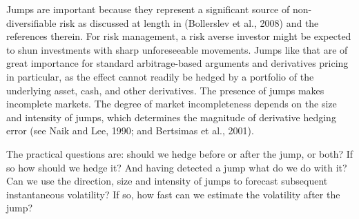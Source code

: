 Jumps are important because they represent a significant source of non-diversifiable risk as discussed at length in (Bollerslev et al., 2008)
and the references therein. For risk management, a risk averse investor might be expected to shun investments with sharp unforeseeable movements.
Jumps like that are of great importance for standard arbitrage-based arguments and derivatives pricing in particular, as the effect cannot readily 
be hedged by a portfolio of the underlying asset, cash, and other derivatives. The presence of jumps makes incomplete markets. The degree of market
incompleteness depends on the size and intensity of jumps, which determines the magnitude of derivative hedging error (see Naik and Lee, 1990; and
Bertsimas et al., 2001). 


The practical questions are: should we hedge before or after the jump, or both? If so how should we hedge it? And having detected a jump what do we do with it? Can we use the direction, size and intensity of jumps to forecast subsequent instantaneous volatility? If so, how fast can we estimate the
volatility after the jump? 



\nocite{ait2010high,
ait2011ultra,               
bannouh2009range,            barndorff2002econometric,   
barndorff2004econometric,   barndorff2009realized,   
barndorff2011multivariate,   bollerslev2008risk,         
christensen2012covariation,  corsi2010threshold,         
delbaen1994general,          dionne2009intraday,         
dovonon2012bootstrapping,    dumas2002implied,           
epps1979comovements,         evans2005currency,          
fan2012vast,                 foster1996continuous,       
griffin2011covariance,       hayashi2005covariance,      
hayashi2006nonsynchronously, hayashi2008asymptotic,      
hull2009options,             mastromatteo2011financial,  
munnix2010compensating,      munnix2010impact,           
mykland2008infrence,         mykland2012econometrics,    
precup2007cross,             puntanen2005historical,     
reno2003closer,              todorov2011volatility,      
toth2007modeling,            toth2009accurate,           
toth2009epps,                voev2007integrated,         
wang2010vast,                zhang2005tale,              
zhang2011estimating,         zhou1998estimating,         
cont2003financial,           dacorogna2001introduction,  
fitzgerald1993financial,     revuz2004continuous,        
schoutens2003levy,           tankov2004financial,        
CMEEurodollar,               toth2008multi,
crash1929,
crash1987,
investorFear, 
forecastVol,
impliedVol, 
assetAllocation,
BankingMarkets,
microstructure,
lowLatency,
utcTime,
highFreqFX,
king2011foreign,
hasbrouck2009technology,
engle2002analysis,
miller1986financial,
jegadeesh1996behavior,
burghardt1994treasury,
chaboud2014rise}